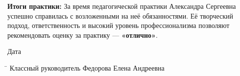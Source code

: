 \documentclass[a4paper,12pt]{article}
\begin{document}
\vspace{5mm}

\textbf{Итоги практики:} За время педагогической практики Александра Сергеевна успешно справилась с возложенными на неё обязанностями. Её творческий подход, ответственность и высокий уровень профессионализма позволяют рекомендовать оценку за практику — \textbf{«отлично»}.

\vspace{10mm}

\noindent
Дата \underline{\hspace{5cm}}
\begin{tabbing}
\hspace{5cm} \= \kill
Классный руководитель \> \underline{\hspace{5cm}} Федорова Елена Андреевна
\end{tabbing}

\vspace{5mm}
\end{document}
